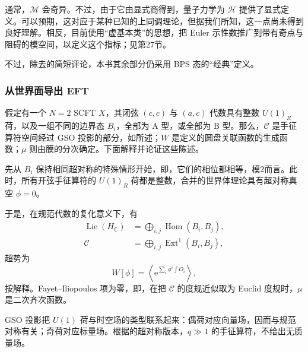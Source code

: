 通常，$\mathcal{M}$ 会奇异。不过，由于它由显式商得到，量子力学为 $\mathcal{H}$ 提供了显式定义。可以预期，这对应于某种已知的上同调理论，但据我们所知，这一点尚未得到良好理解。相反，目前使用“虚基本类”的思想，把 Euler 示性数推广到带有奇点与阻碍的模空间，以定义这个指标；见第27节。

不过，除去的简短评论，本书其余部分仍采用 BPS 态的“经典”定义。

\subsubsection{从世界面导出 EFT}\label{sec:5.4.3.2}

假定有一个 $N=2$ SCFT $X$，其闭弦 $(c,c)$ 与 $(a,c)$ 代数具有整数 $U(1)_R$ 荷，以及一组不同的边界态 $B_i$，全部为 A 型，或全部为 B 型。那么，$\mathcal{C}$ 是手征算符空间经过 GSO 投影的部分，如所述；$W$ 是定义的圆盘关联函数的生成函数；$\mu$ 则由膜的分次确定。下面解释并论证这些陈述。

先从 $B_i$ 保持相同超对称的特殊情形开始，即，它们的相位都相等，模2而言。此时，所有开弦手征算符的 $U(1)_R$ 荷都是整数，合并的世界体理论具有超对称真空 $\phi=0$。

于是，在规范代数的复化意义下，有
\begin{equation}\label{eq:5.88}
\begin{aligned}
\operatorname{Lie}(H_{\mathbb C})&=\bigoplus_{i,j}\operatorname{Hom}(B_i,B_j),\\
\mathcal{C}&=\bigoplus_{i,j}\operatorname{Ext}^1(B_i,B_j),
\end{aligned}
\end{equation}
超势为
\begin{equation}\label{eq:5.89}
W[\phi]=\left\langle
\mathrm{e}^{\sum_i\phi^i\int O_i}\right\rangle,
\end{equation}
按解释。Fayet--Iliopoulos 项为零，即，在把 $\mathcal{C}$ 的度规近似取为 Euclid 度规时，$\mu$ 是二次齐次函数。

GSO 投影把 $U(1)$ 荷与时空场的类型联系起来：偶荷对应向量场，因而与规范对称有关；奇荷对应标量场。根据的超对称版本，$q\gg1$ 的手征算符，不给出无质量场。

